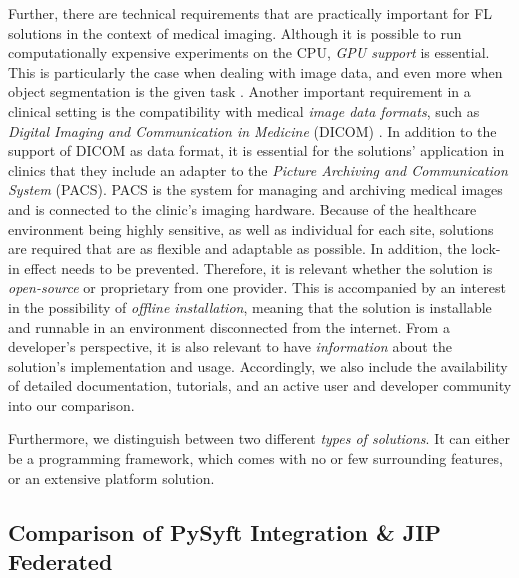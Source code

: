 Further, there are technical requirements that are practically important for FL solutions in the context of medical imaging.
Although it is possible to run computationally expensive experiments on the CPU, \textit{GPU support} is essential. This is particularly the case when dealing with image data, and even more when object segmentation is the given task \citep{Kaissis2021End-to-endImaging, Lee2021FederatedEnvironment}.
Another important requirement in a clinical setting is the  compatibility with medical \textit{image data formats}, such as \textit{Digital Imaging and Communication in Medicine} (DICOM) \citep{Kaissis2021End-to-endImaging}.
In addition to the support of DICOM as data format, it is essential for the solutions' application in clinics that they  include an adapter to the \textit{Picture Archiving and Communication System} (PACS). PACS is the system for managing and archiving medical images and is connected to the clinic's imaging hardware.
Because of the healthcare environment being highly sensitive, as well as individual for each site, solutions are required that are as flexible and adaptable as possible. In addition, the lock-in effect needs to be prevented. Therefore, it is relevant whether the solution is \textit{open-source} or proprietary from one provider.
This is accompanied by an interest in the possibility of \textit{offline installation}, meaning that the solution is installable and runnable in an environment disconnected from the internet.
From a developer's perspective, it is also relevant to have \textit{information} about the solution's implementation and usage. Accordingly, we also include the availability of detailed documentation, tutorials, and an active user and developer community into our comparison.

Furthermore, we distinguish between two different \textit{types of solutions}. It can either be a programming framework, which comes with no or few surrounding features, or an extensive platform solution.






\subsection{Comparison of PySyft Integration \& JIP Federated}
\label{subsec:ResultsRuntime}

